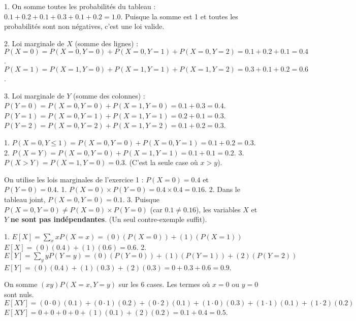 
\begin{correctionbox}
1.  On somme toutes les probabilités du tableau :
    $0.1 + 0.2 + 0.1 + 0.3 + 0.1 + 0.2 = 1.0$.
    Puisque la somme est 1 et toutes les probabilités sont non négatives, c'est une loi valide.

2.  Loi marginale de $X$ (somme des lignes) :
    $P(X=0) = P(X=0, Y=0) + P(X=0, Y=1) + P(X=0, Y=2) = 0.1 + 0.2 + 0.1 = 0.4$.
    $P(X=1) = P(X=1, Y=0) + P(X=1, Y=1) + P(X=1, Y=2) = 0.3 + 0.1 + 0.2 = 0.6$.

3.  Loi marginale de $Y$ (somme des colonnes) :
    $P(Y=0) = P(X=0, Y=0) + P(X=1, Y=0) = 0.1 + 0.3 = 0.4$.
    $P(Y=1) = P(X=0, Y=1) + P(X=1, Y=1) = 0.2 + 0.1 = 0.3$.
    $P(Y=2) = P(X=0, Y=2) + P(X=1, Y=2) = 0.1 + 0.2 = 0.3$.
\end{correctionbox}

\begin{correctionbox}
1.  $P(X=0, Y \le 1) = P(X=0, Y=0) + P(X=0, Y=1) = 0.1 + 0.2 = 0.3$.
2.  $P(X=Y) = P(X=0, Y=0) + P(X=1, Y=1) = 0.1 + 0.1 = 0.2$.
3.  $P(X > Y) = P(X=1, Y=0) = 0.3$. (C'est la seule case où $x > y$).
\end{correctionbox}

\begin{correctionbox}
On utilise les lois marginales de l'exercice 1 : $P(X=0)=0.4$ et $P(Y=0)=0.4$.
1.  $P(X=0) \times P(Y=0) = 0.4 \times 0.4 = 0.16$.
2.  Dans le tableau joint, $P(X=0, Y=0) = 0.1$.
3.  Puisque $P(X=0, Y=0) \neq P(X=0) \times P(Y=0)$ (car $0.1 \neq 0.16$), les variables $X$ et $Y$ \textbf{ne sont pas indépendantes}. (Un seul contre-exemple suffit).
\end{correctionbox}


\begin{correctionbox}
1.  $E[X] = \sum_x x P(X=x) = (0)(P(X=0)) + (1)(P(X=1))$
    $E[X] = (0)(0.4) + (1)(0.6) = 0.6$.
2.  $E[Y] = \sum_y y P(Y=y) = (0)(P(Y=0)) + (1)(P(Y=1)) + (2)(P(Y=2))$
    $E[Y] = (0)(0.4) + (1)(0.3) + (2)(0.3) = 0 + 0.3 + 0.6 = 0.9$.
\end{correctionbox}

\begin{correctionbox}
On somme $(xy)P(X=x, Y=y)$ sur les 6 cases. Les termes où $x=0$ ou $y=0$ sont nuls.
$E[XY] = (0 \cdot 0)(0.1) + (0 \cdot 1)(0.2) + (0 \cdot 2)(0.1) + (1 \cdot 0)(0.3) + (1 \cdot 1)(0.1) + (1 \cdot 2)(0.2)$
$E[XY] = 0 + 0 + 0 + 0 + (1)(0.1) + (2)(0.2) = 0.1 + 0.4 = 0.5$.
\end{correctionbox}

